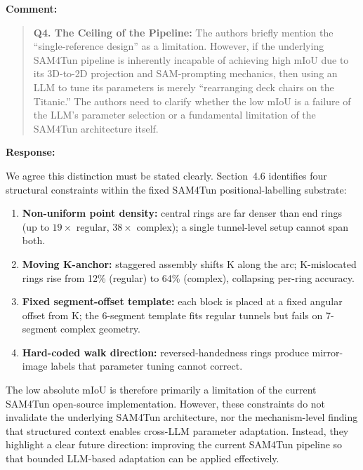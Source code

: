 \documentclass[11pt,a4paper]{article}
\newenvironment{commentblock}{%
  \par\smallskip\noindent\textbf{Comment:}\par
  \begin{quote}\itshape\color{black}
}{%
  \end{quote}\smallskip
}
\newenvironment{responseblock}{%
  \par\smallskip\noindent\textbf{Response:}\par
  \begingroup\color{responsegreen}
}{%
  \endgroup\smallskip
}
\begin{document}
\begin{commentblock}
\textbf{Q4. The Ceiling of the Pipeline:} The authors briefly mention the ``single-reference design'' as a limitation. However, if the underlying SAM4Tun pipeline is inherently incapable of achieving high mIoU due to its 3D-to-2D projection and SAM-prompting mechanics, then using an LLM to tune its parameters is merely ``rearranging deck chairs on the Titanic.'' The authors need to clarify whether the low mIoU is a failure of the LLM's parameter selection or a fundamental limitation of the SAM4Tun architecture itself.
\end{commentblock}
\begin{responseblock}
We agree this distinction must be stated clearly. Section~4.6 identifies four structural constraints within the fixed SAM4Tun positional-labelling substrate:
\begin{enumerate}[nosep]
  \item \textbf{Non-uniform point density:} central rings are far denser than end rings (up to $19\times$ regular, $38\times$ complex); a single tunnel-level setup cannot span both.
  \item \textbf{Moving K-anchor:} staggered assembly shifts K along the arc; K-mislocated rings rise from 12\% (regular) to 64\% (complex), collapsing per-ring accuracy.
  \item \textbf{Fixed segment-offset template:} each block is placed at a fixed angular offset from K; the 6-segment template fits regular tunnels but fails on 7-segment complex geometry.
  \item \textbf{Hard-coded walk direction:} reversed-handedness rings produce mirror-image labels that parameter tuning cannot correct.
\end{enumerate}
The low absolute mIoU is therefore primarily a limitation of the current SAM4Tun open-source implementation. However, these constraints do not invalidate the underlying SAM4Tun architecture, nor the mechanism-level finding that structured context enables cross-LLM parameter adaptation. Instead, they highlight a clear future direction: improving the current SAM4Tun pipeline so that bounded LLM-based adaptation can be applied effectively.
\end{responseblock}
\end{document}
